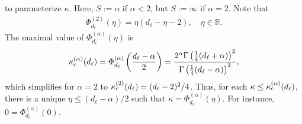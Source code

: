 \documentclass[12pt,reqno]{amsart}
\theoremstyle{definition}
\theoremstyle{remark}
\numberwithin{equation}{section}
\newcommand{\1}{\mathbbm{1}}
\newcommand{\R}{\mathbb{R}}
\begin{document}
to parameterize $\kappa$. Here, $S:=\alpha$ if $\alpha<2$, but $S:=\infty$ if $\alpha=2$. Note that
\begin{align}
  \Phi_{d_\ell}^{(2)}(\eta) = \eta(d_\ell-\eta-2), \quad \eta\in \R.
\end{align}
The maximal value of $\Phi_{d_\ell}^{(\alpha)}(\eta)$ is 
\begin{align}\index{$\kappa_{\rm c}^{(\alpha)}(d_\ell)$}
  \label{eq:defgammacell}
  \kappa_{\rm c}^{(\alpha)}(d_\ell) = \Phi_{d_\ell}^{(\alpha)}\left(\frac{d_\ell-\alpha}{2}\right)
  = \frac{2^{\alpha} \Gamma \left(\frac{1}{4} (d_\ell+\alpha)\right)^2}{\Gamma \left(\frac{1}{4} (d_\ell-\alpha)\right)^2},
\end{align}
which simplifies for $\alpha=2$ to $\kappa_{\rm c}^{(2)}(d_\ell)=(d_\ell-2)^2/4$. Thus, for each $\kappa\leq\kappa_{\rm c}^{(\alpha)}(d_\ell)$, there is a unique $\eta \leq (d_\ell-\alpha)/2$ such that $\kappa=\Phi_{d_\ell}^{(\alpha)}(\eta)$. For instance, $0=\Phi_{d_\ell}^{(\alpha)}(0)$. 
\end{document}
